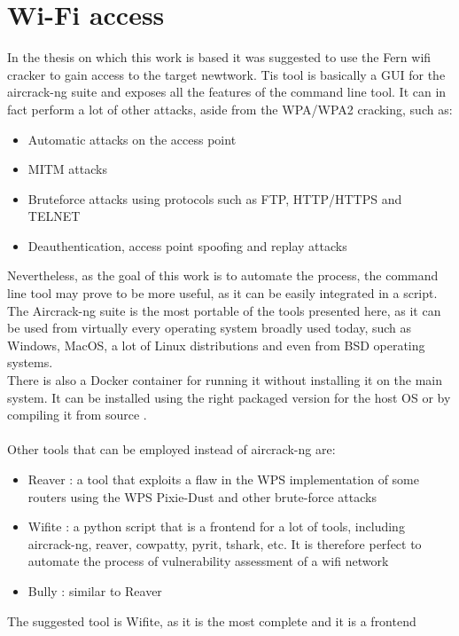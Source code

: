 \chapter{Wi-Fi access}
In the thesis on which \cite{previouswork} this work is based it was suggested
to use the Fern wifi cracker \cite{fern} to gain access to the target newtwork.
Tis tool is basically a GUI for the aircrack-ng suite \cite{aircrack} and
exposes all the features of the command line tool. It can in fact perform
a lot of other attacks, aside from the WPA/WPA2 cracking, such as:
\begin{itemize}
    \item Automatic attacks on the access point
    \item MITM attacks
    \item Bruteforce attacks using protocols such as FTP, HTTP/HTTPS and TELNET
    \item Deauthentication, access point spoofing and replay attacks
\end{itemize}
Nevertheless, as the goal of this work is to automate the process, the command
line tool may prove to be more useful, as it can be easily integrated in a
script.\\
The Aircrack-ng suite is the most portable of the tools presented here, as it
can be used from virtually every operating system broadly used today, such as 
Windows, MacOS, a lot of Linux distributions and even from BSD operating systems.\\
There is also a Docker container for running it without installing it on the
main system. It can be installed using the right packaged version for the host OS
or by compiling it from source \cite{aircrack-git}.\\\\
Other tools that can be employed instead of aircrack-ng are:
\begin{itemize}
    \item Reaver \cite{reaver}: a tool that exploits a flaw in the WPS
        implementation of some routers using the WPS Pixie-Dust and other brute-force attacks
    \item Wifite \cite{wifite}: a python script that is a frontend for a lot of 
        tools, including aircrack-ng, reaver, cowpatty, pyrit, tshark, etc. It
        is therefore perfect to automate the process of vulnerability assessment
        of a wifi network
    \item Bully \cite{bully}: similar to Reaver
\end{itemize}
The suggested tool is Wifite, as it is the most complete and it is a frontend
